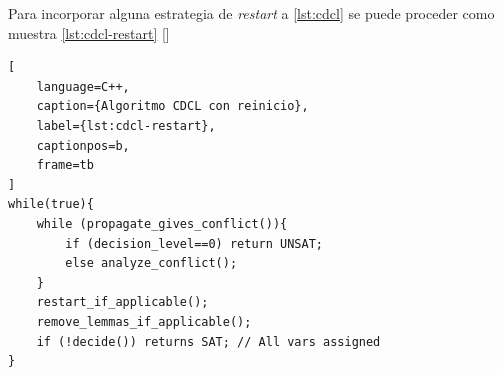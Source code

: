 Para incorporar alguna estrategia de \textit{restart} a \ref{lst:cdcl}  se puede proceder como muestra \ref{lst:cdcl-restart} [\cite{oliveras2009dpll_cdcl}]

\begin{lstlisting}[
    language=C++,
    caption={Algoritmo CDCL con reinicio},
    label={lst:cdcl-restart},
    captionpos=b,
    frame=tb
]
while(true){
	while (propagate_gives_conflict()){
		if (decision_level==0) return UNSAT;
		else analyze_conflict();
	}
	restart_if_applicable();
	remove_lemmas_if_applicable();
	if (!decide()) returns SAT; // All vars assigned
}

\end{lstlisting}







